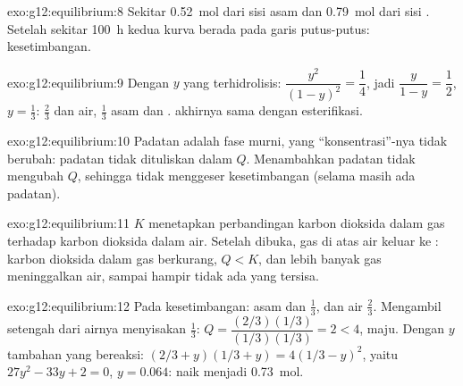 \begin{solution}{exo:g12:equilibrium:8}
Sekitar \qty{0.52}{mol} dari sisi asam dan \qty{0.79}{mol} dari sisi
. Setelah sekitar \qty{100}{h} kedua kurva berada pada garis
putus-putus: kesetimbangan.
\end{solution}

\begin{solution}{exo:g12:equilibrium:9}
Dengan $y$  yang terhidrolisis: $\dfrac{y^2}{(1-y)^2} = \dfrac{1}{4}$,
jadi $\dfrac{y}{1-y} = \dfrac{1}{2}$, $y = \frac{1}{3}$: $\frac{2}{3}$
  dan air, $\frac{1}{3}$  asam dan .  akhirnya
sama dengan  esterifikasi.
\end{solution}

\begin{solution}{exo:g12:equilibrium:10}
Padatan adalah fase murni, yang ``konsentrasi''-nya tidak berubah:
padatan tidak dituliskan dalam $Q$. Menambahkan padatan tidak mengubah
$Q$, sehingga tidak menggeser kesetimbangan (selama masih ada padatan).
\end{solution}

\begin{solution}{exo:g12:equilibrium:11}
$K$ menetapkan perbandingan karbon dioksida dalam gas terhadap karbon
dioksida dalam air. Setelah dibuka, gas di atas air keluar ke :
karbon dioksida dalam gas berkurang, $Q < K$, dan lebih banyak gas
meninggalkan air, sampai hampir tidak ada yang tersisa.
\end{solution}

\begin{solution}{exo:g12:equilibrium:12}
Pada kesetimbangan: asam dan  $\frac{1}{3}$,  dan air
$\frac{2}{3}$. Mengambil setengah dari airnya menyisakan $\frac{1}{3}$:
$Q = \dfrac{(2/3)(1/3)}{(1/3)(1/3)} = 2 < 4$, maju. Dengan $y$ tambahan
yang bereaksi: $(2/3 + y)(1/3 + y) = 4(1/3 - y)^2$, yaitu
$27y^2 - 33y + 2 = 0$, $y = 0.064$:  naik menjadi
\qty{0.73}{mol}.
\end{solution}

